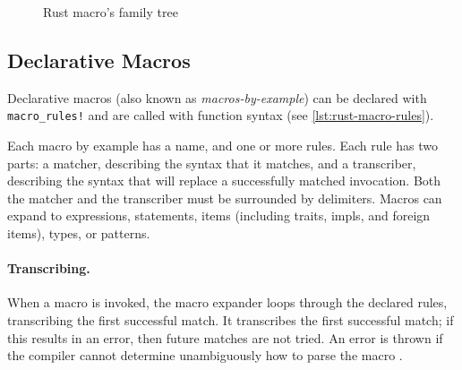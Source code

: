 \begin{figure}
    \centering
    \caption{Rust macro's family tree}
    \label{fig:rust-macro-family}
\end{figure}

\subsection{Declarative Macros}\label{sec:rust-macros:decl}

Declarative macros (also known as \emph{macros-by-example}) can be declared with \texttt{macro\_rules!}
and are called with function syntax (see \autoref{lst:rust-macro-rules}).

\begin{displayquote}
    Each macro by example has a name, and one or more rules.
    Each rule has two parts: a matcher, describing the syntax that it matches, and a transcriber,
    describing the syntax that will replace a successfully matched invocation.
    Both the matcher and the transcriber must be surrounded by delimiters.
    Macros can expand to expressions, statements, items
    (including traits, impls, and foreign items), types, or patterns.
\end{displayquote}

\paragraph{Transcribing.}
When a macro is invoked, the macro expander loops through the declared rules, transcribing the first successful match.
It transcribes the first successful match; if this results in an error, then future matches are not tried.
An error is thrown if the compiler cannot determine unambiguously how to parse the macro
\autocite[Section 3.1 - Transcribing]{RustRef2021}.

